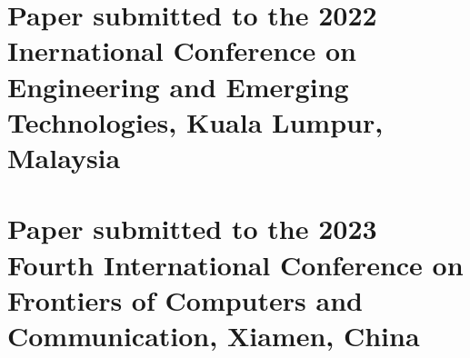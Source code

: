 \chapter{Paper submitted to the 2022 Inernational Conference on Engineering and Emerging Technologies, Kuala Lumpur, Malaysia}


\chapter{Paper submitted to the 2023 Fourth International Conference on Frontiers of Computers and Communication, Xiamen, China}
